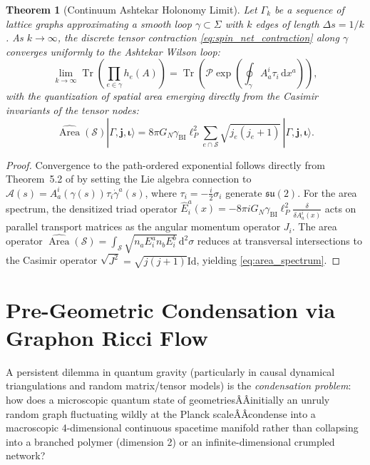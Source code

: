 \documentclass[11pt,a4paper,reqno]{amsart}
\newtheorem{theorem}{Theorem}[section]
\theoremstyle{definition}
\numberwithin{equation}{section}
\newcommand{\Id}{\mathrm{Id}}
\newcommand{\Tr}{\operatorname{Tr}}
\newcommand{\Area}{\operatorname{Area}}
\newcommand{\dif}{\,\mathrm{d}}
\begin{document}
\begin{theorem}[Continuum Ashtekar Holonomy Limit]
\label{thm:ashtekar_limit}
Let $\Gamma_k$ be a sequence of lattice graphs approximating a smooth loop $\gamma \subset \Sigma$ with $k$ edges of length $\Delta s = 1/k$. As $k \to \infty$, the discrete tensor contraction \eqref{eq:spin_net_contraction} along $\gamma$ converges uniformly to the Ashtekar Wilson loop:
\begin{equation}
    \lim_{k \to \infty} \Tr\left( \prod_{e \in \gamma} h_e(A) \right) = \Tr\left( \mathcal{P} \exp\left( \oint_\gamma A_a^i \tau_i \dif x^a \right) \right),
\end{equation}
with the quantization of spatial area emerging directly from the Casimir invariants of the tensor nodes:
\begin{equation}
    \label{eq:area_spectrum}
    \widehat{\Area}(\mathcal{S}) |\Gamma, \mathbf{j}, \mathbf{\iota}\rangle = 8\pi G_N \gamma_{\mathrm{BI}} \ell_P^2 \sum_{e \cap \mathcal{S}} \sqrt{j_e(j_e + 1)} \, |\Gamma, \mathbf{j}, \mathbf{\iota}\rangle.
\end{equation}
\end{theorem}
\begin{proof}
Convergence to the path-ordered exponential follows directly from Theorem~5.2 of \cite{turing2026flows} by setting the Lie algebra connection to $\mathcal{A}(s) = A_a^i(\gamma(s)) \tau_i \dot{\gamma}^a(s)$, where $\tau_i = -\frac{i}{2} \sigma_i$ generate $\mathfrak{su}(2)$. For the area spectrum, the densitized triad operator $\widehat{E}_i^a(x) = -8\pi i G_N \gamma_{\mathrm{BI}} \ell_P^2 \frac{\delta}{\delta A_a^i(x)}$ acts on parallel transport matrices as the angular momentum operator $J_i$. The area operator $\widehat{\Area}(\mathcal{S}) = \int_{\mathcal{S}} \sqrt{n_a E_i^a n_b E_i^b} \dif^2 \sigma$ reduces at transversal intersections to the Casimir operator $\sqrt{J^2} = \sqrt{j(j+1)} \Id$, yielding \eqref{eq:area_spectrum}.
\end{proof}

\section{Pre-Geometric Condensation via Graphon Ricci Flow}
\label{sec:pre_geometry}

A persistent dilemma in quantum gravity (particularly in causal dynamical triangulations and random matrix/tensor models) is the \emph{condensation problem}: how does a microscopic quantum state of geometriesÂÂinitially an unruly random graph fluctuating wildly at the Planck scaleÂÂcondense into a macroscopic 4-dimensional continuous spacetime manifold rather than collapsing into a branched polymer (dimension 2) or an infinite-dimensional crumpled network?
\end{document}
